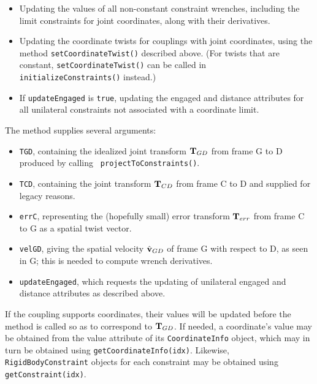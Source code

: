 \begin{itemize}

\item Updating the values of all non-constant constraint wrenches,
including the limit constraints for joint coordinates, along with their
derivatives.

\item Updating the coordinate twists for couplings with joint coordinates,
using the method {\tt setCoordinateTwist()} described above. (For twists that
are constant, {\tt setCoordinateTwist()} can be called in {\tt
initializeConstraints()} instead.)

\item If {\tt updateEngaged} is {\tt true}, updating the {\sf engaged}
and {\sf distance} attributes for all unilateral constraints not associated
with a coordinate limit.

\end{itemize}

The method supplies several arguments: 

\begin{itemize}

\item {\tt TGD}, containing the idealized joint transform
${\bf T}_{GD}$ from frame G to D produced by calling {\tt
projectToConstraints()}.

\item {\tt TCD}, containing the joint transform ${\bf T}_{CD}$ from
frame C to D and supplied for legacy reasons.

\item {\tt errC}, representing the (hopefully small) error transform
${\bf T}_{err}$ from frame C to G as a spatial twist vector.

\item {\tt velGD}, giving the spatial velocity $\hat{{\bf v}}_{GD}$ of frame
G with respect to D, as seen in G; this is needed to compute wrench
derivatives.

\item {\tt updateEngaged}, which requests the updating of unilateral
{\sf engaged} and {\sf distance} attributes as described above.

\end{itemize}

If the coupling supports coordinates, their values will be updated
before the method is called so as to correspond to ${\bf T}_{GD}$. If
needed, a coordinate's value may be obtained from the {\sf value}
attribute of its {\tt CoordinateInfo} object, which may in turn be
obtained using {\tt getCoordinateInfo(idx)}. Likewise, {\tt
RigidBodyConstraint} objects for each constraint may be obtained using
{\tt getConstraint(idx)}.

